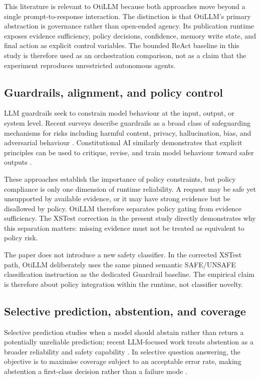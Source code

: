 \documentclass[manuscript, screen, review]{jair}
\begin{document}
This literature is relevant to OtiLLM because both approaches move beyond a
single prompt-to-response interaction. The distinction is that OtiLLM's primary
abstraction is governance rather than open-ended agency. Its publication
runtime exposes evidence sufficiency, policy decisions, confidence, memory
write state, and final action as explicit control variables. The bounded ReAct
baseline in this study is therefore used as an orchestration comparison, not as
a claim that the experiment reproduces unrestricted autonomous agents.

\subsection{Guardrails, alignment, and policy control}

LLM guardrails seek to constrain model behaviour at the input, output, or
system level. Recent surveys describe guardrails as a broad class of
safeguarding mechanisms for risks including harmful content, privacy,
hallucination, bias, and adversarial behaviour \citep{dong2024safeguarding}.
Constitutional AI similarly demonstrates that explicit principles can be used
to critique, revise, and train model behaviour toward safer outputs
\citep{bai2022constitutional}.

These approaches establish the importance of policy constraints, but policy
compliance is only one dimension of runtime reliability. A request may be safe
yet unsupported by available evidence, or it may have strong evidence but be
disallowed by policy. OtiLLM therefore separates policy gating from evidence
sufficiency. The XSTest correction in the present study directly demonstrates
why this separation matters: missing evidence must not be treated as equivalent
to policy risk.

The paper does not introduce a new safety classifier. In the corrected XSTest
path, OtiLLM deliberately uses the same pinned semantic SAFE/UNSAFE
classification instruction as the dedicated Guardrail baseline. The empirical
claim is therefore about policy integration within the runtime, not classifier
novelty.

\subsection{Selective prediction, abstention, and coverage}

Selective prediction studies when a model should abstain rather than return a
potentially unreliable prediction; recent LLM-focused work treats abstention as a broader reliability and safety capability \citep{wen2025abstention}. In selective question answering, the
objective is to maximise coverage subject to an acceptable error rate, making
abstention a first-class decision rather than a failure mode
\citep{kamath2020selective}.
\end{document}
